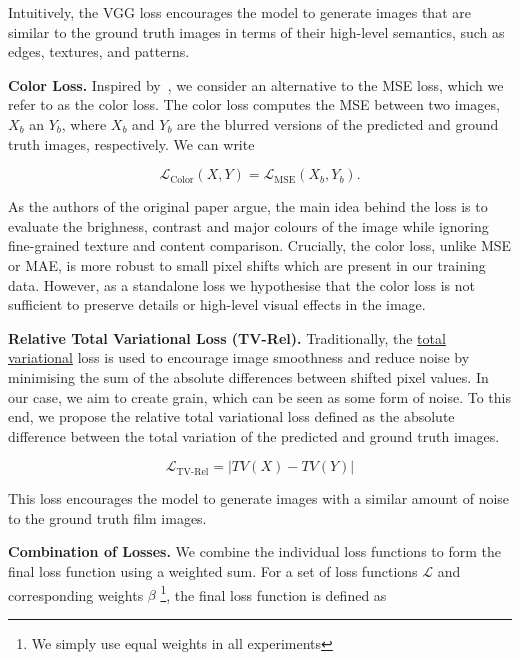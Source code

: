 Intuitively, the VGG loss encourages the model to generate images that are similar to the ground truth images in terms of their high-level semantics, such 
as edges, textures, and patterns.

\textbf{Color Loss.} Inspired by~\cite{dslr-quality}, we consider an alternative to the MSE loss, which we refer to as the color loss. The color loss computes the MSE between two images, $X_b$ an $Y_b$, where $X_b$ and $Y_b$ are the blurred versions of the predicted and ground truth images, respectively. We can write

\begin{equation}
    \mathcal{L}_\text{Color}(X, Y) = \mathcal{L}_\text{MSE}(X_b, Y_b).
    \label{eq:color}
\end{equation}

As the authors of the original paper argue, the main idea behind the loss is to evaluate the brighness, contrast and major colours of the image while ignoring fine-grained texture and content comparison. Crucially, the color loss, unlike MSE or MAE, is more robust to small pixel shifts which are present in our training data. However, as a standalone loss we hypothesise that the color loss is not sufficient to preserve details or high-level visual effects in the image.

\textbf{Relative Total Variational Loss (TV-Rel).} Traditionally, the \href{https://lightning.ai/docs/torchmetrics/stable/image/total_variation.html}{total variational} loss is used to encourage image smoothness and reduce noise by minimising the sum of the absolute differences between shifted pixel values. In our case, we aim to create grain, which can be seen as some form of noise. To this end, we propose the relative total variational loss defined as the absolute difference between the total variation of the predicted and ground
truth images. 

\begin{equation}
    \mathcal{L}_\text{TV-Rel} = |TV(X) - TV(Y)| 
    \label{eq:tv-rel}
  \end{equation}

This loss encourages the model to generate images with a similar
amount of noise to the ground truth film images.



\textbf{Combination of Losses.} We combine the individual loss functions to form the final loss function using a weighted sum. For a set of loss functions $\mathcal{L}$ and corresponding weights $\beta$ \footnote{We simply use equal weights in all experiments}, the final loss function is defined as

